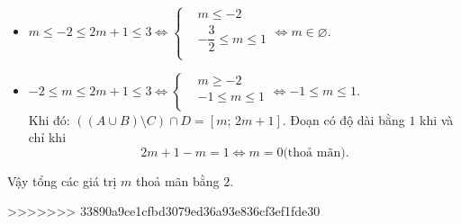 \begin{ex}
{\begin{enumerate}[+)]
\begin{itemize}
Đoạn có độ dài bằng $1$ khi và chỉ khi \[3-m=1\Leftrightarrow m=2 \text{(thoả mãn)}.\]
\item $m\le -2\le 2m+1\le 3\Leftrightarrow \left\{ \begin{aligned}
& m\le -2 \\
& -\dfrac{3}{2}\le m\le 1 \\
\end{aligned} \right.\Leftrightarrow m\in \varnothing $.
\item $-2\le m\le 2m+1\le 3\Leftrightarrow \left\{ \begin{aligned}
& m\ge -2 \\
& -1\le m\le 1 \\
\end{aligned} \right.\Leftrightarrow -1\le m\le 1$.\\
Khi đó: $\left( \left( A\cup B \right)\setminus C \right)\cap D=\left[ m;\,2m+1 \right]$.
Đoạn có độ dài bằng $1$ khi và chỉ khi \[2m+1-m=1\Leftrightarrow m=0 \text{(thoả mãn)}.\]
\end{itemize}
\end{enumerate}
Vậy tổng các giá trị $m$ thoả mãn bằng $2$.}
\end{ex}
>>>>>>> 33890a9ce1cfbd3079ed36a93e836cf3ef1fde30
